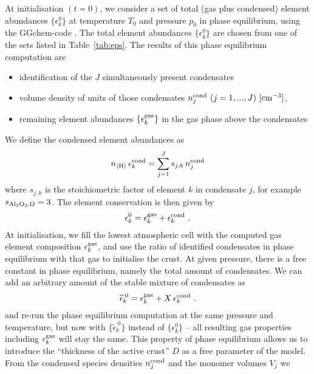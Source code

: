 \documentclass[11pt]{article}
\def\nH{n_{\langle\rm H\rangle}}
\begin{document}
At initialisation $(t=0)$, we consider a set of total (gas plus
condensed) element abundances $\{\epsilon_k^0\}$ at temperature
$T_0$ and pressure $p_0$ in phase equilibrium, using the {\sc
  GGchem}-code \citep{Woitke2017}.  The total element abundances
$\{\epsilon_k^0\}$ are chosen from one of the sets listed in
Table~\ref{tab:eps}. The results of this phase equilibrium 
computation are
\begin{itemize}
\itemsep=-1pt
\parsep=0pt
  \item identification of the $J$ simultaneously present 
        condensates 
  \item volume density of units of those condensates
        $n_j^{\rm cond}\ (j=1,...,J)\ \rm[cm^{-3}]$,
  \item remaining element abundances $\{\epsilon_k^{\rm gas}\}$ in the gas
        phase above the condensates
\end{itemize}
We define the condensed element abundances as
\begin{equation}
  \nH\,\epsilon_k^{\rm cond} = \sum_{j=1}^J s_{j,k}\,n_j^{\rm cond}
  \label{ekcond}
\end{equation}
where $s_{j,k}$ is the stoichiometric factor of element $k$ in
condensate $j$, for example $s_{\rm Al_2O_3,O}=3$. The element
conservation is then given by
\begin{equation}
  \epsilon_k^0 = \epsilon_k^{\rm gas} + \epsilon_k^{\rm cond} \ .
\end{equation}
At initialisation, we fill the lowest atmospheric cell with the
computed  gas element composition $\epsilon_k^{\rm gas}$, and use 
the ratio of identified condensates in phase equilibrium with that gas to
initialise the crust. At given pressure, there is a free constant in
phase equilibrium, namely the total amount of condensates. We can add
an arbitrary amount of the stable mixture of condensates as
\begin{equation}
  \widetilde{\epsilon}_k^{\;0} = \epsilon_k^{\rm gas} 
                           + X\,\epsilon_k^{\rm cond} \ .
\end{equation}
and re-run the phase equilibrium computation at the same pressure and
temperature, but now with $\{\widetilde\epsilon_k^{\;0}\}$ instead of
$\{\epsilon_k^0\}$ -- all resulting gas properties including
$\epsilon_k^{\rm gas}$ will stay the same.  This property of phase
equilibrium allows us to introduce the ``thickness of the active
crust'' $D$ as a free parameter of the model. From the condensed
species densities $n_j^{\rm cond}$ and the monomer volumes $V_j$ we
\end{document}
